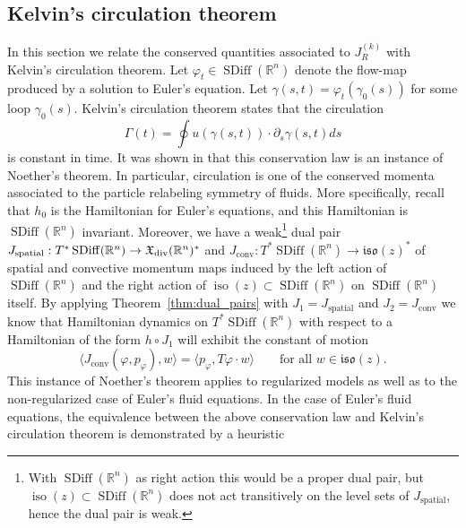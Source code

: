\documentclass[12pt]{amsart}
\newcommand{\R}{\ensuremath{\mathbb{R}}}
\DeclareMathOperator{\SDiff}{SDiff}
\DeclareMathOperator{\iso}{iso}
\begin{document}
  \subsection{Kelvin's circulation theorem}
  \label{sec:Kelvin}
  In this section we relate the conserved quantities associated
  to $J_R^{(k)}$ with Kelvin's circulation theorem.
Let $\varphi_t \in \SDiff(\R^n)$ denote the flow-map
produced by a solution to Euler's equation.
Let $\gamma(s,t) = \varphi_t(\gamma_0(s))$ for some loop $\gamma_0(s)$.
Kelvin's circulation theorem states that the circulation
\begin{equation*}\label{eq:Kelvin-circulation}
  \Gamma(t) = \oint u( \gamma(s,t) )  \cdot \partial_s \gamma(s,t) ds
\end{equation*}
is constant in time.
It was shown in \cite{Arnold1966} that this conservation law
is an instance of Noether's theorem.
In particular, circulation is one of the conserved momenta
associated to the particle relabeling symmetry of fluids.
More specifically,
recall that $h_0$ is the Hamiltonian for Euler's equations,
and this Hamiltonian is $\SDiff(\R^n)$ invariant. Moreover, we have a
weak\footnote{%
  With $\SDiff(\R^n)$ as right action this would be a proper dual
  pair, but $\iso(z) \subset \SDiff(\R^n)$ does not act transitively
  on the level sets of $J_\text{spatial}$, hence the dual pair is weak.
} dual pair
$J_\text{spatial}: T^*\SDiff(\R^n) \to \mathfrak{X}_{\rm div}(\R^n)^*$
and $J_\text{conv}: T^*\SDiff(\R^n) \to \mathfrak{iso}(z)^*$ of
spatial and convective momentum maps induced by
the left action of $\SDiff(\R^n)$ and the right action of
$\iso(z) \subset \SDiff(\R^n)$ on $\SDiff(\R^n)$ itself.
By applying Theorem~\ref{thm:dual_pairs} with $J_1 = J_\text{spatial}$
and $J_2 = J_\text{conv}$ we know that Hamiltonian dynamics on
$T^*\SDiff(\R^n)$ with respect to a Hamiltonian of the form
$h \circ J_1$ will exhibit the constant of motion
\begin{equation}\label{eq:abstract-circulation}
  \langle J_\text{conv}(\varphi,p_\varphi) , w \rangle
  = \langle p_\varphi , T\varphi \cdot w \rangle
  \qquad \text{for all } w \in \mathfrak{iso}(z).
\end{equation}
This instance of Noether's theorem applies to regularized models as well as to the non-regularized case of Euler's fluid equations.
In the case of Euler's fluid equations, the equivalence between the above conservation law
and Kelvin's circulation theorem is demonstrated by a heuristic
\end{document}
